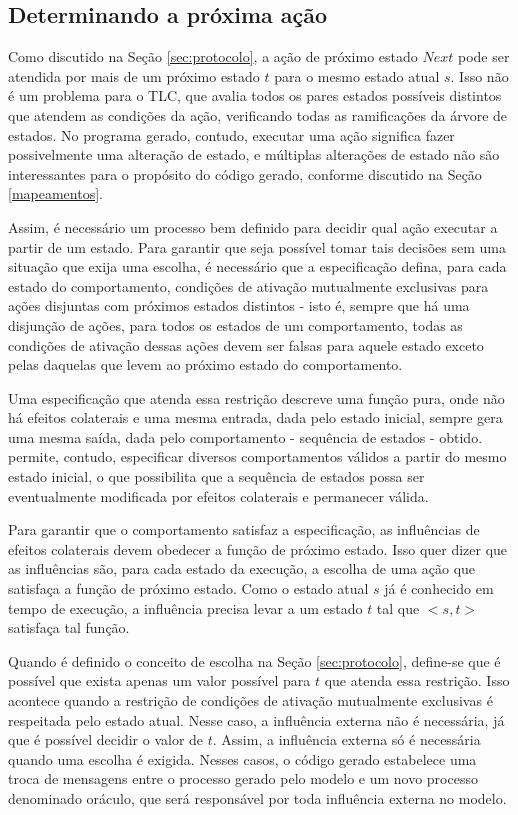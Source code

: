 \subsection{Determinando a próxima ação}
\label{sec:decisao}

Como discutido na Seção \ref{sec:protocolo}, a ação de próximo estado $Next$
pode ser atendida por mais de um próximo estado $t$ para o mesmo estado atual $s$.
Isso não é um problema para o TLC, que avalia todos os pares estados possíveis distintos
que atendem as condições da ação, verificando todas as ramificações da árvore de
estados. No programa gerado, contudo, executar uma ação significa fazer possivelmente uma alteração de estado, e
múltiplas alterações de estado não são interessantes para o propósito do
código gerado, conforme discutido na Seção \ref{mapeamentos}.

Assim, é necessário um processo bem definido para decidir qual ação executar a
partir de um estado. Para garantir que seja possível tomar tais decisões sem uma
situação que exija uma escolha, é
necessário que a especificação defina, para cada estado do comportamento, condições de ativação mutualmente
exclusivas para ações disjuntas com próximos estados distintos - isto é,
sempre que há uma disjunção de ações, para todos os estados de um comportamento,
todas as condições de ativação dessas ações devem ser falsas para aquele estado exceto pelas daquelas
que levem ao próximo estado do comportamento.

Uma especificação que atenda essa restrição descreve uma função pura, onde não
há efeitos colaterais e uma mesma entrada, dada pelo estado inicial, sempre gera uma mesma
saída, dada pelo comportamento - sequência de estados - obtido. \TLA permite,
contudo, especificar diversos comportamentos válidos a partir do mesmo estado
inicial, o que possibilita que a sequência de estados possa ser eventualmente modificada por
efeitos colaterais e permanecer válida.

Para garantir que o comportamento satisfaz a especificação, as influências de
efeitos colaterais devem obedecer a função de próximo estado. Isso quer dizer
que as influências são, para cada estado da execução, a escolha de uma ação que
satisfaça a função de próximo estado. Como o estado atual $s$ já é conhecido em
tempo de execução, a influência precisa levar a um estado $t$ tal que $<s,t>$
satisfaça tal função.

Quando é definido o conceito de escolha na Seção \ref{sec:protocolo}, define-se que é possível
que exista apenas um valor possível para $t$ que atenda essa restrição. Isso acontece quando a restrição
de condições de ativação mutualmente exclusivas é respeitada pelo estado atual.
Nesse caso, a influência externa não é necessária, já que é possível decidir o
valor de $t$. Assim, a influência externa só é necessária quando uma escolha é
exigida. Nesses casos, o código gerado estabelece uma troca de mensagens entre o
processo gerado pelo modelo e um novo processo denominado oráculo, que será
responsável por toda influência externa no modelo.

